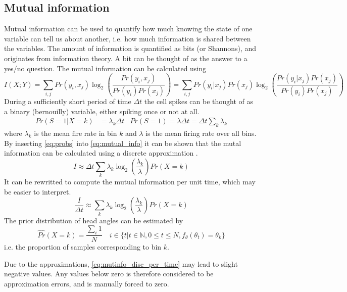 \subsection{Mutual information}
Mutual information can be used to quantify how much knowing the state of one variable can tell us about another, i.e. how much information is shared between the variables.
The amount of information is quantified as bits (or Shannons), and originates from information theory. A bit can be thought of as the answer to a yes/no question. 
The mutual information can be calculated using 
\begin{equation}\label{eq:mutual_info}
    I(X;Y) = \sum_{i, j} Pr(y_i,x_j) \log_2(\frac{Pr(y_i, x_j)}{Pr(y_i)Pr(x_j)}) = \sum_{i,j}Pr(y_i|x_j)Pr(x_j) \log_2(\frac{Pr(y_i | x_j)Pr(x_j)}{Pr(y_i)Pr(x_j)})
\end{equation}
During a sufficiently short period of time $\Delta t$ the cell spikes can be thought of as a binary (bernouilly) variable, either spiking once or not at all. \cite{mutualinfo}
\begin{align} \label{eq:probs}
    Pr(S=1 | X = k) &= \lambda_k \Delta t & Pr(S=1) = \lambda \Delta t = \Delta t \sum_k \lambda_k
\end{align}
where $\lambda_k$ is the mean fire rate in bin $k$ and $\lambda$ is the mean firing rate over all bins.
By inserting \cref{eq:probs} into \cref{eq:mutual_info} it can be shown that the mutal information can be calculated using a discrete approximation \cite{mutualinfo}.
\begin{equation} \label{eq:mutinfo_disc}
    I \approx \Delta t \sum_k \lambda_k \log_2(\frac{\lambda_k}{\lambda})Pr(X = k)
\end{equation}
It can be rewritted to compute the mutual information per unit time, which may be easier to interpret.
\begin{equation} \label{eq:mutinfo_disc_per_time}
    \frac{I}{\Delta t} \approx \sum_k \lambda_k \log_2(\frac{\lambda_k}{\lambda})Pr(X = k)
\end{equation}
The prior distribution of head angles can be estimated by
\begin{equation}
    \hat{Pr}(X = k) = \frac{\sum_i 1}{N}  \quad i \in \{t | t \in \mathbb{N}, 0 \leq t \leq N, f_\theta(\theta_t) = \theta_k\}
\end{equation}
i.e. the proportion of samples corresponding to bin $k$.

Due to the approximations, \cref{eq:mutinfo_disc_per_time} may lead to slight negative values. Any values below zero is therefore considered to be approximation errors, and is manually forced to zero.

